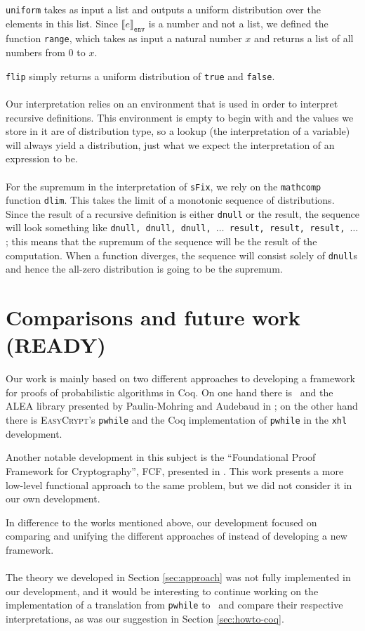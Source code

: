 \documentclass[11pt, leqno, titlepage]{article}
\def\coqe{\lstinline[language=Coq, basicstyle=\small]}
\theoremstyle{definition}
\begin{document}
\texttt{uniform} takes as input a list and outputs a uniform distribution over the
elements in this list. Since $\llbracket e\rrbracket_{\texttt{env}}$ is a number and
not a list, we defined the function \texttt{range}, which takes as input a natural
number $x$ and returns a list of all numbers from 0 to $x$.

\texttt{flip} simply returns a uniform distribution of \texttt{true} and
\texttt{false}. \\
\\
Our interpretation relies on an environment that is used in order to interpret
recursive definitions. This environment is empty to begin with and the values we
store in it are of distribution type, so a lookup (the interpretation of a variable)
will always yield a distribution, just what we expect the interpretation of an
expression to be. \\
\\
For the supremum in the interpretation of \coqe{sFix}, we rely on the
\texttt{mathcomp} function \texttt{dlim}. This takes the limit of a monotonic
sequence of distributions. Since the result of a recursive definition is either
\texttt{dnull} or the result, the sequence will look something like \texttt{dnull,
  dnull, dnull, $\dots$ result, result, result, $\dots$}; this means that the
supremum of the sequence will be the result of the computation. When a function
diverges, the sequence will consist solely of \texttt{dnull}s  and hence the all-zero
distribution is going to be the supremum. 

\section{Comparisons and future work (READY)}
\label{sec:future}
Our work is mainly based on two different approaches to developing a framework for
proofs of probabilistic algorithms in Coq. On one hand there is \rml\ and the ALEA
library presented by Paulin-Mohring and Audebaud in \cite{rml-paper}; on the other
hand there is \textsc{EasyCrypt}'s \texttt{pwhile} and the Coq implementation of
\texttt{pwhile} in the \texttt{xhl} development.

Another notable development in this subject is the ``Foundational Proof Framework for
Cryptography'', FCF, presented in \cite{fcf}. This work presents a more low-level
functional approach to the same problem, but we did not consider it in our own
development. 

In difference to the works mentioned above, our development focused on comparing and
unifying the different approaches of instead of developing a new framework.\\
\\
The theory we developed in Section \ref{sec:approach} was not fully implemented in
our development, and it would be interesting to continue working on the
implementation of a translation from \texttt{pwhile} to \rml\ and compare their
respective interpretations, as was our suggestion in Section \ref{sec:howto-coq}.
\end{document}

